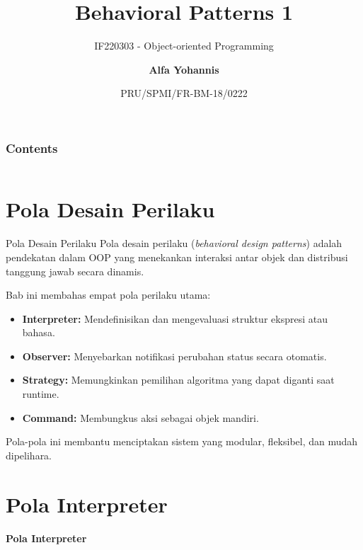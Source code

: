 \documentclass[aspectratio=169, table]{beamer}
\subtitle{IF220303 - Object-oriented Programming}
\title{\Huge{Behavioral Patterns 1}\\\vspace{30pt}}
\date[Serial]{\scriptsize {PRU/SPMI/FR-BM-18/0222}}
\author[Pradita]{\small {\textbf{Alfa Yohannis}}}
\begin{document}
\frame{\titlepage}

\begin{frame}[fragile]
\frametitle{Contents}
\vspace{20pt}
\begin{columns}[t]
\tableofcontents[sections={1-3}]

\tableofcontents[sections={4-5}]
\end{columns}
\end{frame}


\section{Pola Desain Perilaku}

\begin{frame}{Pola Desain Perilaku}
	\vspace{10pt}
	Pola desain perilaku (\textit{behavioral design patterns}) adalah pendekatan dalam OOP yang menekankan interaksi antar objek dan distribusi tanggung jawab secara dinamis.
	
	\vspace{10pt}
	Bab ini membahas empat pola perilaku utama:
	\begin{itemize}
		\item \textbf{Interpreter:} Mendefinisikan dan mengevaluasi struktur ekspresi atau bahasa.
		\item \textbf{Observer:} Menyebarkan notifikasi perubahan status secara otomatis.
		\item \textbf{Strategy:} Memungkinkan pemilihan algoritma yang dapat diganti saat runtime.
		\item \textbf{Command:} Membungkus aksi sebagai objek mandiri.
	\end{itemize}
	
	\vspace{5pt}
	Pola-pola ini membantu menciptakan sistem yang modular, fleksibel, dan mudah dipelihara.
\end{frame}


\section{Pola Interpreter}

\begin{frame}{\hfill}
	\centering
	\textbf{\Huge{Pola Interpreter}}
\end{frame}
\end{document}
